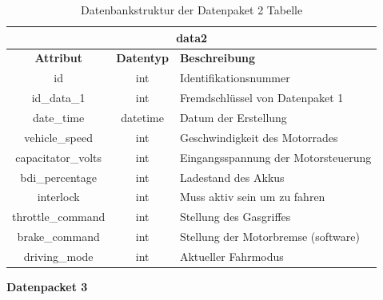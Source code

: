 \begin{table}[H]
	\begin{center}
		\begin{tabular}{|c|c|l|}
			\hline
			\multicolumn{3}{|c|}{\textbf{data2}} \\ \hline
			\textbf{Attribut}  & \textbf{Datentyp} & \textbf{Beschreibung}               \\ \hline
			id                 & int               & Identifikationsnummer               \\ \hline
			id\_data\_1        & int               & Fremdschlüssel von Datenpaket 1     \\ \hline
			date\_time         & datetime          & Datum der Erstellung                \\ \hline
			vehicle\_speed     & int               & Geschwindigkeit des Motorrades      \\ \hline
			capacitator\_volts & int               & Eingangsspannung der Motorsteuerung \\ \hline
			bdi\_percentage    & int               & Ladestand des Akkus              	 \\ \hline
			interlock          & int               & Muss aktiv sein um zu fahren        \\ \hline
			throttle\_command  & int               & Stellung des Gasgriffes             \\ \hline
			brake\_command     & int               & Stellung der Motorbremse (software) \\ \hline
			driving\_mode      & int               & Aktueller Fahrmodus                 \\ \hline
		\end{tabular}
			\caption{Datenbankstruktur der Datenpaket 2 Tabelle}
			\label{tab:data2}
	\end{center}
\end{table}

\textbf{Datenpacket 3}


